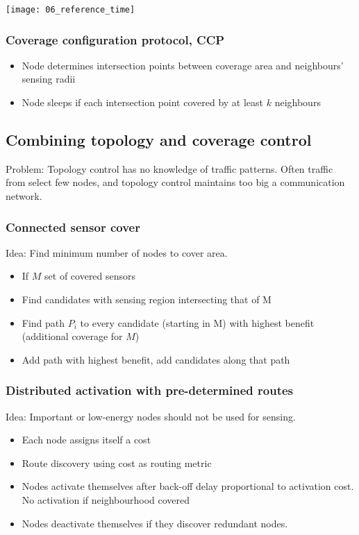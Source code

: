 \texttt{[image: 06\_reference\_time]}

\subsubsection{Coverage configuration protocol, CCP}

\begin{itemize}
		\item Node determines intersection points between coverage area and neighbours' sensing radii
		\item Node sleeps if each intersection point covered by at least $k$ neighbours
\end{itemize}

\subsection{Combining topology and coverage control}

Problem: Topology control has no knowledge of traffic patterns. Often traffic
from select few nodes, and topology control maintains too big a communication
network.

\subsubsection{Connected sensor cover}

Idea: Find minimum number of nodes to cover area.

\begin{itemize}
		\item If $M$ set of covered sensors
		\item Find candidates with sensing region intersecting that of M
		\item Find path $P_i$ to every candidate (starting in M) with highest
				benefit (additional coverage for $M$)
		\item Add path with highest benefit, add candidates along that path
\end{itemize}

\subsubsection{Distributed activation with pre-determined routes}

Idea: Important or low-energy nodes should not be used for sensing.

\begin{itemize}
		\item Each node assigns itself a cost
		\item Route discovery using cost as routing metric
		\item Nodes activate themselves after back-off delay proportional to activation cost. No activation if neighbourhood covered
		\item Nodes deactivate themselves if they discover redundant nodes.
\end{itemize}
